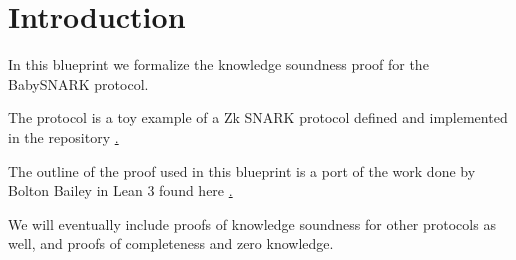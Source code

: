 \chapter*{Introduction}\label{chap:intro}

In this blueprint we formalize the knowledge soundness proof for the BabySNARK protocol. 

The protocol is a toy example of a Zk SNARK protocol defined and implemented in the repository \href{https://github.com/initc3/babySNARK}. 

The outline of the proof used in this blueprint is a port of the work done by Bolton Bailey in Lean 3 found here \href{https://github.com/BoltonBailey/formal-snarks-project/}. 

We will eventually include proofs of knowledge soundness for other protocols as well, and proofs of completeness and zero knowledge. 